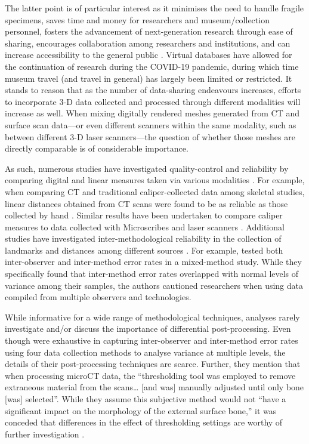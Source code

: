 \documentclass[review]{elsarticle}
\begin{document}
The latter point is of particular interest as it minimises the need to handle fragile specimens, saves time and money for researchers and museum/collection personnel, fosters the advancement of next-generation research through ease of sharing, encourages collaboration among researchers and institutions, and can increase accessibility to the general public \citep{RN5929,RN5930,RN11508,RN11505,RN726,RN4138,RN5902}. Virtual databases have allowed for the continuation of research during the COVID-19 pandemic, during which time museum travel (and travel in general) has largely been limited or restricted. It stands to reason that as the number of data-sharing endeavours increases, efforts to incorporate 3-D data collected and processed through different modalities will increase as well. When mixing digitally rendered meshes generated from CT and surface scan data---or even different scanners within the same modality, such as between different 3-D laser scanners---the question of whether those meshes are directly comparable is of considerable importance.

As such, numerous studies have investigated quality-control and reliability by comparing digital and linear measures taken via various modalities \citep{RN11474,RN11475,RN11476}. For example, when comparing CT and traditional caliper-collected data among skeletal studies, linear distances obtained from CT scans were found to be as reliable as those collected by hand \citep{RN5894,RN5893,RN5895,RN5896,zonn1989}. Similar results have been undertaken to compare caliper measures to data collected with Microscribes \citep{RN11487,RN11475} and laser scanners \citep{RN5886}. Additional studies have investigated inter-methodological reliability in the collection of landmarks and distances among different sources \citep{RN5879,RN5892,RN11522,RN5897,RN5901}. For example, \citet{RN11945} tested both inter-observer and inter-method error rates in a mixed-method study. While they specifically found that inter-method error rates overlapped with normal levels of variance among their samples, the authors cautioned researchers when using data compiled from multiple observers and technologies. 

While informative for a wide range of methodological techniques, analyses rarely investigate and/or discuss the importance of differential post-processing. Even though \citet[64]{RN11945} were exhaustive in capturing inter-observer and inter-method error rates using four data collection methods to analyse variance at multiple levels, the details of their post-processing techniques are scarce. Further, they mention that when processing microCT data, the “thresholding tool was employed to remove extraneous material from the scans… [and was] manually adjusted until only bone [was] selected”. While they assume this subjective method would not “have a significant impact on the morphology of the external surface bone,” it was conceded that differences in the effect of thresholding settings are worthy of further investigation \citep[64]{RN11945}.
\end{document}
